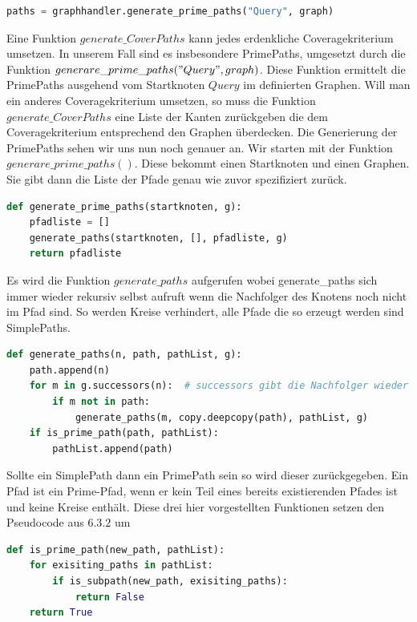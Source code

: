 \begin{lstlisting}[language=Python]
paths = graphhandler.generate_prime_paths("Query", graph)
\end{lstlisting}

Eine Funktion $generate\_CoverPaths$ kann jedes erdenkliche Coveragekriterium umsetzen.
In unserem Fall sind es insbesondere PrimePaths, umgesetzt durch die Funktion $generare\_prime\_paths("Query", graph)$.
Diese Funktion ermittelt die PrimePaths ausgehend vom Startknoten $Query$ im definierten Graphen.
Will man ein anderes Coveragekriterium umsetzen, so muss die Funktion $generate\_CoverPaths$ eine Liste der Kanten zurückgeben
die dem Coveragekriterium entsprechend den Graphen überdecken.
Die Generierung der PrimePaths sehen wir uns nun noch genauer an.
Wir starten mit der Funktion $generare\_prime\_paths()$.
Diese bekommt einen Startknoten und einen Graphen.
Sie gibt dann die Liste der Pfade genau wie zuvor spezifiziert zurück.

\begin{lstlisting}[language=Python]
def generate_prime_paths(startknoten, g):
    pfadliste = []
    generate_paths(startknoten, [], pfadliste, g)
    return pfadliste
\end{lstlisting}

Es wird die Funktion $generate\_paths$ aufgerufen wobei generate\_paths sich immer wieder rekursiv selbst aufruft wenn die Nachfolger des Knotens
noch nicht im Pfad sind. So werden Kreise verhindert, alle Pfade die so erzeugt werden sind SimplePaths.

\begin{lstlisting}[language=Python]
def generate_paths(n, path, pathList, g):
    path.append(n)
    for m in g.successors(n):  # successors gibt die Nachfolger wieder
        if m not in path:
            generate_paths(m, copy.deepcopy(path), pathList, g)
    if is_prime_path(path, pathList):
        pathList.append(path)
\end{lstlisting}

Sollte ein SimplePath dann ein PrimePath sein so wird dieser zurückgegeben.
Ein Pfad ist ein Prime-Pfad, wenn er kein Teil eines bereits existierenden Pfades ist und keine Kreise enthält.
Diese drei hier vorgestellten Funktionen setzen den Pseudocode aus $6.3.2$ um

\begin{lstlisting}[language=Python]
def is_prime_path(new_path, pathList):
    for exisiting_paths in pathList:
        if is_subpath(new_path, exisiting_paths):
            return False
    return True
\end{lstlisting}






